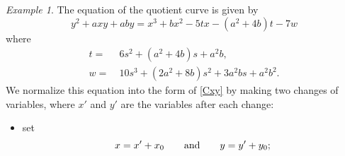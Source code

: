 \documentclass{gtpart}
\theoremstyle{definition}
\theoremstyle{remark}
\newtheorem{ex}[thm]{Example}
\newcommand{\ad}{{\rm and}}
\numberwithin{equation}{section}
\numberwithin{thm}{section}
\begin{document}
\begin{ex}
 The equation of the quotient curve is given by 
 \[
  y^2 + a x y + a b y = x^3 + b x^2 - 5 t x - (a^2 + 4 b) t - 7 w 
 \]
 where 
 \begin{equation*}
 \begin{split}
  t = & ~ 6 s^2 + (a^2 + 4 b) s + a^2 b, \\
  w = & ~ 10 s^3 + (2 a^2 + 8 b) s^2 + 3 a^2 b s + a^2 b^2.  
 \end{split}
 \end{equation*}
 We normalize this equation into the form of \eqref{Cxy} by making two 
 changes of variables, where $x'$ and $y'$ are the variables after each 
 change: 
 \begin{itemize}
  \item set 
  \[
   x = x' + x_0 \qquad \ad \qquad y = y' + y_0; 
  \]


\end{itemize}
\end{ex}
\end{document}

